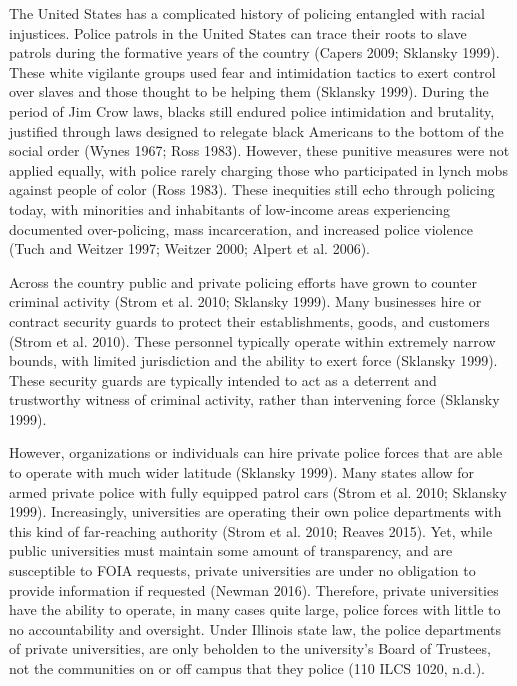 \documentclass{ucetd}
\begin{document}
The United States has a complicated history of policing entangled with
racial injustices. Police patrols in the United States can trace their
roots to slave patrols during the formative years of the country (Capers
2009; Sklansky 1999). These white vigilante groups used fear and
intimidation tactics to exert control over slaves and those thought to
be helping them (Sklansky 1999). During the period of Jim Crow laws,
blacks still endured police intimidation and brutality, justified
through laws designed to relegate black Americans to the bottom of the
social order (Wynes 1967; Ross 1983). However, these punitive measures
were not applied equally, with police rarely charging those who
participated in lynch mobs against people of color (Ross 1983). These
inequities still echo through policing today, with minorities and
inhabitants of low-income areas experiencing documented over-policing,
mass incarceration, and increased police violence (Tuch and Weitzer
1997; Weitzer 2000; Alpert et al. 2006).

Across the country public and private policing efforts have grown to
counter criminal activity (Strom et al. 2010; Sklansky 1999). Many
businesses hire or contract security guards to protect their
establishments, goods, and customers (Strom et al. 2010). These
personnel typically operate within extremely narrow bounds, with limited
jurisdiction and the ability to exert force (Sklansky 1999). These
security guards are typically intended to act as a deterrent and
trustworthy witness of criminal activity, rather than intervening force
(Sklansky 1999).

However, organizations or individuals can hire private police forces
that are able to operate with much wider latitude (Sklansky 1999). Many
states allow for armed private police with fully equipped patrol cars
(Strom et al. 2010; Sklansky 1999). Increasingly, universities are
operating their own police departments with this kind of far-reaching
authority (Strom et al. 2010; Reaves 2015). Yet, while public
universities must maintain some amount of transparency, and are
susceptible to FOIA requests, private universities are under no
obligation to provide information if requested (Newman 2016). Therefore,
private universities have the ability to operate, in many cases quite
large, police forces with little to no accountability and oversight.
Under Illinois state law, the police departments of private
universities, are only beholden to the university's Board of Trustees,
not the communities on or off campus that they police (110 ILCS 1020,
n.d.).
\end{document}
